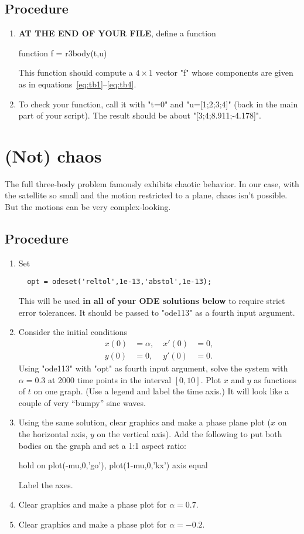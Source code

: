 \documentclass[11pt,twoside]{article}
\begin{document}
\subsection*{Procedure}
\begin{enumerate}
  \item \textbf{AT THE END OF YOUR FILE}, define a function 
  \begin{matlab}
  function f = r3body(t,u)
  \end{matlab}
  This function should compute a $4\times 1$ vector "f" whose components are given as in equations~\eqref{eq:tb1}--\eqref{eq:tb4}. 
  \item To check your function, call it with "t=0" and "u=[1;2;3;4]" (back in the main part of your script). The result should be about "[3;4;8.911;-4.178]".
\end{enumerate}

\section{(Not) chaos}

The full three-body problem famously exhibits chaotic behavior. In our case, with the satellite so small and the motion restricted to a plane, chaos isn't possible. But the motions can be very complex-looking.

\subsection*{Procedure}
\begin{enumerate}
  \item Set
  \begin{verbatim}
  opt = odeset('reltol',1e-13,'abstol',1e-13);
  \end{verbatim}
  This will be used \textbf{in all of your ODE solutions below} to require strict error tolerances. It should be passed to "ode113" as a fourth input argument. 
  \item Consider the initial conditions 
  \begin{align*}
    x(0) &= \alpha, \; & x'(0) &= 0, \\
    y(0) &= 0, \; & y'(0) &= 0.
  \end{align*}
  Using "ode113" with "opt" as fourth input argument, solve the system with $\alpha = 0.3$ at 2000 time points in the interval $[0,10]$. Plot $x$ and $y$ as functions of $t$ on one graph. (Use a legend and label the time axis.) It will look like a couple of very ``bumpy'' sine waves.
  \item Using the same solution, clear graphics and make a phase plane plot ($x$ on the horizontal axis, $y$ on the vertical axis). Add the following to put both bodies on the graph and set a 1:1 aspect ratio:
  \begin{matlab}
  hold on
  plot(-mu,0,'go'), plot(1-mu,0,'kx')
  axis equal
  \end{matlab}
  Label the axes.
  \item Clear graphics and make a phase plot for $\alpha=0.7$.
  \item Clear graphics and make a phase plot for $\alpha=-0.2$.
\end{enumerate}
\end{document}
